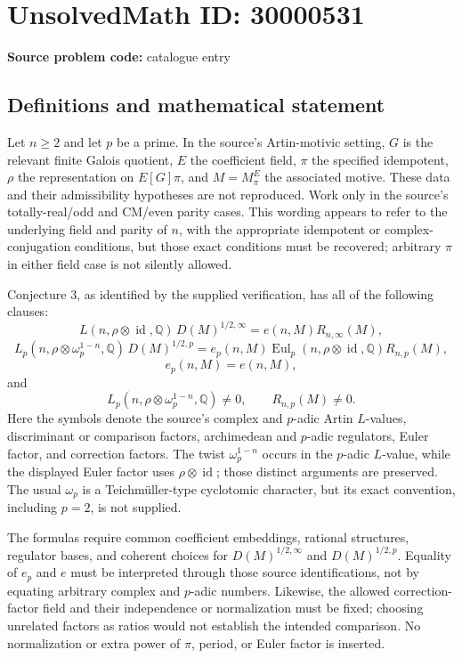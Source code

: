 \documentclass[11pt]{article}
\newcommand{\Q}{\mathbb{Q}}
\begin{document}
\section*{UnsolvedMath ID: 30000531}
\textbf{Source problem code:} catalogue entry
\subsection{Definitions and mathematical statement}
Let \(n\geq2\) and let \(p\) be a prime. In the source's Artin-motivic setting, \(G\) is the relevant finite Galois quotient, \(E\) the coefficient field, \(\pi\) the specified idempotent, \(\rho\) the representation on \(E[G]\pi\), and \(M=M_\pi^E\) the associated motive. These data and their admissibility hypotheses are not reproduced. Work only in the source's totally-real/odd and CM/even parity cases. This wording appears to refer to the underlying field and parity of \(n\), with the appropriate idempotent or complex-conjugation conditions, but those exact conditions must be recovered; arbitrary \(\pi\) in either field case is not silently allowed.

Conjecture 3, as identified by the supplied verification, has all of the following clauses:
\[
L(n,\rho\otimes\operatorname{id},\Q)\,D(M)^{1/2,\infty}
=e(n,M)R_{n,\infty}(M),
\]
\[
L_p(n,\rho\otimes\omega_p^{1-n},\Q)\,D(M)^{1/2,p}
=e_p(n,M)\operatorname{Eul}_p(n,\rho\otimes\operatorname{id},\Q)R_{n,p}(M),
\]
\[
e_p(n,M)=e(n,M),
\]
and
\[
L_p(n,\rho\otimes\omega_p^{1-n},\Q)\ne0,
\qquad R_{n,p}(M)\ne0.
\]
Here the symbols denote the source's complex and \(p\)-adic Artin \(L\)-values, discriminant or comparison factors, archimedean and \(p\)-adic regulators, Euler factor, and correction factors. The twist \(\omega_p^{1-n}\) occurs in the \(p\)-adic \(L\)-value, while the displayed Euler factor uses \(\rho\otimes\operatorname{id}\); those distinct arguments are preserved. The usual \(\omega_p\) is a Teichm\"uller-type cyclotomic character, but its exact convention, including \(p=2\), is not supplied.

The formulas require common coefficient embeddings, rational structures, regulator bases, and coherent choices for \(D(M)^{1/2,\infty}\) and \(D(M)^{1/2,p}\). Equality of \(e_p\) and \(e\) must be interpreted through those source identifications, not by equating arbitrary complex and \(p\)-adic numbers. Likewise, the allowed correction-factor field and their independence or normalization must be fixed; choosing unrelated factors as ratios would not establish the intended comparison. No normalization or extra power of \(\pi\), period, or Euler factor is inserted.
\end{document}
